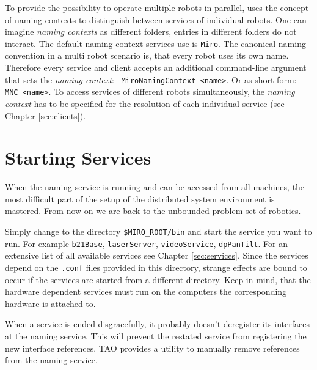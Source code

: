 To provide the possibility to operate multiple robots in parallel,
\miro uses the concept of naming contexts to distinguish
between services of individual robots. One can imagine {\em naming
  contexts} as different folders, entries in different folders do not
interact. The default naming context \miro services use is
{\tt Miro}. The canonical naming convention in a multi robot
scenario is, that every robot uses its own name. Therefore every
\miro service and client accepts an additional command-line argument
that sets the {\em naming context}: 
{\tt -MiroNamingContext <name>}. Or as short form: 
{\tt -MNC <name>}.
To access services of different robots simultaneously, the
{\em naming context} has to be specified for the resolution of
each individual service (see Chapter \ref{sec:clients}).


\section{Starting Services}

When the naming service is running and can be accessed from all
machines, the most difficult part of the setup of the distributed
system environment is mastered. From now on we are back to the
unbounded problem set of robotics.

Simply change to the directory {\tt \$MIRO\_ROOT/bin} and start the
service you want to run. For example {\tt b21Base},
{\tt laserServer}, {\tt videoService}, {\tt dpPanTilt}. For
an extensive list of all available services see Chapter
\ref{sec:services}. Since the services depend on the {\tt *.conf}
files provided in this directory, strange effects are bound to occur
if the services are started from a different directory. Keep in mind,
that the hardware dependent services must run on the computers the
corresponding hardware is attached to.


When a service is ended disgracefully, it probably doesn't deregister
its interfaces at the naming service. This will prevent the restated
service from registering the new interface references. TAO provides a
utility to manually remove references from the naming service. 

